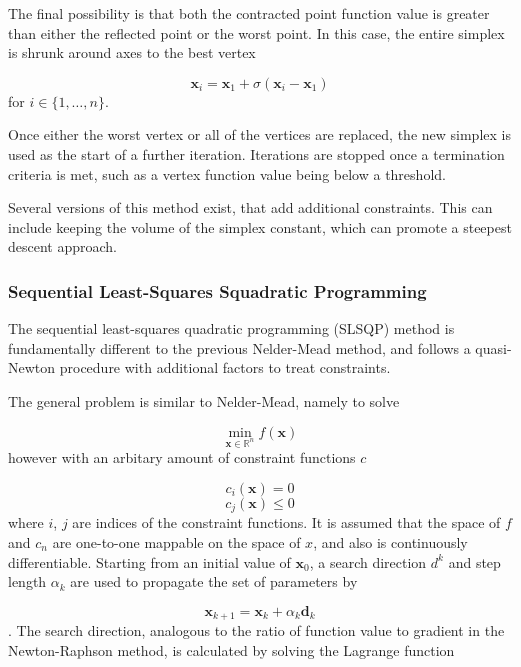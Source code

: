 The final possibility is that both the contracted point function value is greater 
than either the reflected point or the worst point. In this case, the entire simplex
is shrunk around axes to the best vertex

\begin{equation}
\mathbf{x}_i = \mathbf{x}_1 + \sigma \left(\mathbf{x}_i - \mathbf{x}_1 \right)
\end{equation}
%
for $i \in \{1, \dots, n\}$.

Once either the worst vertex or all of the vertices are replaced, the new simplex
is used as the start of a further iteration. Iterations are stopped once a termination
criteria is met, such as a vertex function value being below a threshold.

Several versions of this method exist, that add additional constraints. This can
include keeping the volume of the simplex constant, which can promote a steepest
descent approach.

\subsubsection{Sequential Least-Squares Squadratic Programming}
\label{subsubsec:slsqp}
The sequential least-squares quadratic programming (SLSQP) method is fundamentally
different to the previous Nelder-Mead method, and follows a quasi-Newton procedure
with additional factors to treat constraints.

The general problem is similar to Nelder-Mead, namely to solve

\begin{equation}
\min_{\mathbf{x} \in \mathbb{R}^n} f\left( \mathbf{x}\right)
\end{equation}
%
however with an arbitary amount of constraint functions $c$

\begin{equation}
c_i \left(\mathbf{x} \right) = 0
\end{equation}
\begin{equation}
c_j \left(\mathbf{x} \right) \leq 0
\end{equation}
%
where $i$, $j$ are indices of the constraint functions.
It is assumed that the space of $f$ and $c_n$ are one-to-one mappable on the
space of $x$, and also is continuously differentiable. Starting from an initial
value of $\mathbf{x}_0$, a search direction $d^k$ and step length $\alpha_k$ are
used to propagate the set of parameters by

\begin{equation}
\mathbf{x}_{k+1} = \mathbf{x}_k + \alpha_k \mathbf{d}_k
\end{equation}
%
. The search direction, analogous to the ratio of function value to gradient in 
the Newton-Raphson method, is calculated by solving the Lagrange function


